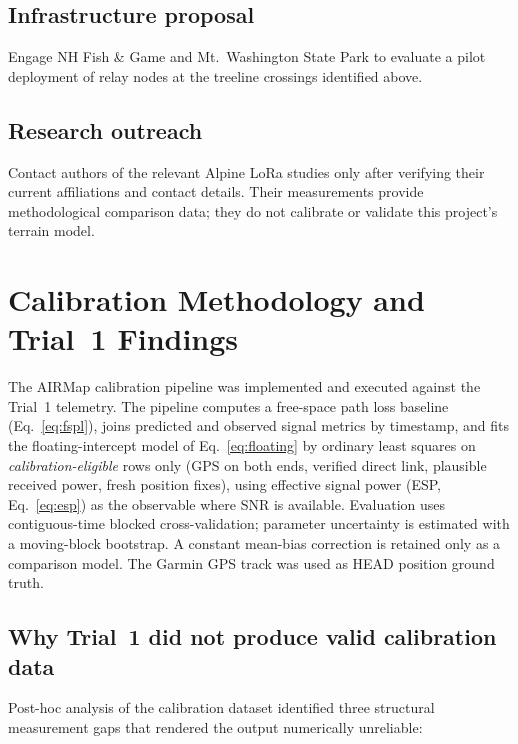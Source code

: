 \documentclass[11pt,letterpaper]{article}
\begin{document}
\subsection*{Infrastructure proposal}
Engage NH Fish \& Game and Mt.\ Washington State Park to evaluate a pilot deployment
of relay nodes at the treeline crossings identified above.

\subsection*{Research outreach}
Contact authors of the relevant Alpine LoRa studies only after verifying their current
affiliations and contact details. Their measurements \cite{bianco2021, bianco2020}
provide methodological comparison data; they do not calibrate or validate this
project's terrain model.

\section{Calibration Methodology and Trial~1 Findings}

The AIRMap calibration pipeline was implemented and executed against the Trial~1
telemetry. The pipeline computes a free-space path loss baseline (Eq.~\ref{eq:fspl}),
joins predicted and observed signal metrics by timestamp, and fits the
floating-intercept model of Eq.~\ref{eq:floating} by ordinary least squares on
\emph{calibration-eligible} rows only (GPS on both ends, verified direct link,
plausible received power, fresh position fixes), using effective signal power (ESP,
Eq.~\ref{eq:esp}) as the observable where SNR is available. Evaluation uses
contiguous-time blocked cross-validation; parameter uncertainty is estimated with a
moving-block bootstrap. A constant mean-bias correction is retained only as a
comparison model. The Garmin GPS track was used as HEAD position ground truth.

\subsection*{Why Trial~1 did not produce valid calibration data}

Post-hoc analysis of the calibration dataset identified three structural measurement
gaps that rendered the output numerically unreliable:
\end{document}
